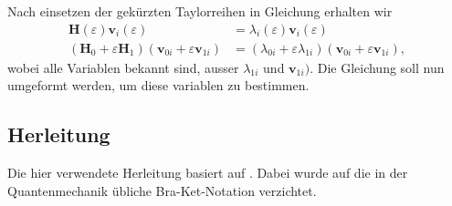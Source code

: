 Nach einsetzen der gekürzten Taylorreihen in Gleichung  erhalten wir
\begin{align}
    \bm H(\varepsilon) \bm v_i(\varepsilon)
    &=
    \lambda_i(\varepsilon) \bm v_i(\varepsilon) \\
    (\bm H_0 + \varepsilon \bm H_1)
    (\bm v_{0i} + \varepsilon \bm v_{1i})
    &=
    (\lambda_{0i} + \varepsilon \lambda_{1i})
    (\bm v_{0i} + \varepsilon \bm v_{1i}),
\end{align}
wobei alle Variablen bekannt sind, ausser $\lambda_{1i}$ und $\bm v_{1i})$.
Die Gleichung soll nun umgeformt werden, um diese variablen zu bestimmen.

\subsection{Herleitung}

Die hier verwendete Herleitung basiert auf \cite{ew:seminar_quantenmechanik}.
Dabei wurde auf die in der Quantenmechanik übliche Bra-Ket-Notation verzichtet.

